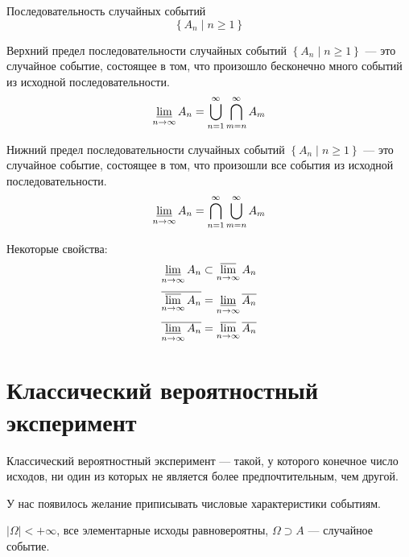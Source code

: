 \begin{definition}
Последовательность случайных событий
$$\left\{A_n\mid n\geq 1\right\}$$
\end{definition}
\begin{definition}
    Верхний предел последовательности случайных событий
    $\left\{A_n\mid n\geq 1\right\}$ --- это
    случайное событие, состоящее в том,
    что произошло бесконечно много событий из исходной последовательности.
    $$\varliminf_{n \to \infty} A_n
    = \bigcup_{n=1}^{\infty} \bigcap_{m=n}^{\infty} A_m $$
\end{definition}
\begin{definition}
    Нижний предел последовательности случайных событий
    $\left\{A_n\mid n\geq 1\right\}$ --- это
    случайное событие, состоящее в том, что произошли все события
    из исходной последовательности.
    $$ \varliminf_{n \to \infty} A_n
    = \bigcap_{n=1}^{\infty} \bigcup_{m=n}^{\infty} A_m $$
\end{definition}

Некоторые свойства:
$$\varliminf_{n \to \infty} A_n \subset \varlimsup_{n \to \infty} A_n $$
$$\overline{\varlimsup_{n \to \infty} A_n}
= \varliminf_{n \to \infty} \overline{A_n}$$
$$\overline{\varliminf_{n \to \infty} A_n}
= \varlimsup_{n \to \infty} \overline{A_n} $$

\section{Классический вероятностный эксперимент}
\begin{definition}
Классический вероятностный эксперимент --- такой, у которого
конечное число исходов,
ни один из которых не является более предпочтительным, чем другой.
\end{definition}

У нас появилось желание приписывать числовые характеристики событиям.

$\left|\Omega\right| < +\infty$,
все элементарные исходы равновероятны,
$\Omega \supset A$ --- случайное событие.

